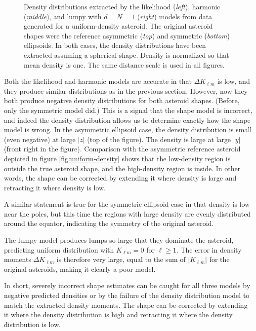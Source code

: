 \documentclass[fleqn,usenatbib]{mnras}
\begin{document}
\begin{figure}
  \caption{Density distributions extracted by the likelihood (\textit{left}), harmonic (\textit{middle}), and lumpy with $d=N=1$ (\textit{right}) models from data generated for a uniform-density asteroid. The original asteroid shapes were the reference asymmetric (\textit{top}) and symmetric (\textit{bottom}) ellipsoids. In both cases, the density distributions have been extracted assuming a spherical shape. Density is normalized so that mean density is one. The same distance scale is used in all figures.}
  \label{fig:sphere-density}
\end{figure}

Both the likelihood and harmonic models are accurate in that $\Delta K_{\ell m}$ is low, and they produce similar distributions as in the previous section. However, now they both produce negative density distributions for both asteroid shapes. (Before, only the symmetric model did.) This is a signal that the shape model is incorrect, and indeed the density distribution allows us to determine exactly how the shape model is wrong. In the asymmetric ellipsoid case, the density distribution is small (even negative) at large $|z|$ (top of the figure). The density is large at large $|y|$ (front right in the figure). Comparison with the asymmetric reference asteroid depicted in figure \ref{fig:uniform-density} shows that the low-density region is outside the true asteroid shape, and the high-density region is inside. In other words, the shape can be corrected by extending it where density is large and retracting it where density is low.

A similar statement is true for the symmetric ellipsoid case in that density is low near the poles, but this time the regions with large density are evenly distributed around the equator, indicating the symmetry of the original asteroid.

The lumpy model produces lumps so large that they dominate the asteroid, predicting uniform distribution with $K_{\ell m} = 0$ for $\ell \geq 1$. The error in density moments $\Delta K_{\ell m}$ is therefore very large, equal to the sum of $|K_{\ell m}|$ for the original asteroids, making it clearly a poor model.

In short, severely incorrect shape estimates can be caught for all three models by negative predicted densities or by the failure of the density distribution model to match the extracted density moments. The shape can be corrected by extending it where the density distribution is high and retracting it where the density distribution is low.
\end{document}
